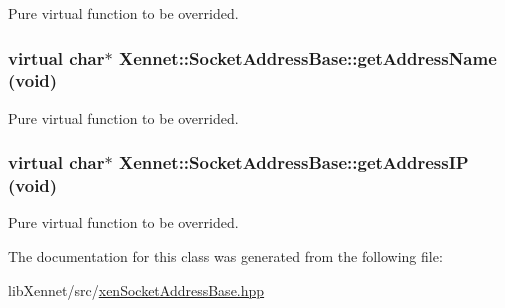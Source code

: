 Pure virtual function to be overrided. 

\hypertarget{classXennet_1_1SocketAddressBase_400550b2dfd27fb8e5f098e83ca079cc}{
\subsubsection{\setlength{\rightskip}{0pt plus 5cm}virtual char$\ast$ Xennet::SocketAddressBase::getAddressName (void)}}
\label{classXennet_1_1SocketAddressBase_400550b2dfd27fb8e5f098e83ca079cc}


Pure virtual function to be overrided. 

\hypertarget{classXennet_1_1SocketAddressBase_00ae0b9d74b1634167567fd79ba708d1}{
\subsubsection{\setlength{\rightskip}{0pt plus 5cm}virtual char$\ast$ Xennet::SocketAddressBase::getAddressIP (void)}}
\label{classXennet_1_1SocketAddressBase_00ae0b9d74b1634167567fd79ba708d1}


Pure virtual function to be overrided. 



The documentation for this class was generated from the following file:\begin{CompactItemize}
\item 
libXennet/src/\hyperlink{xenSocketAddressBase_8hpp}{xenSocketAddressBase.hpp}\end{CompactItemize}
